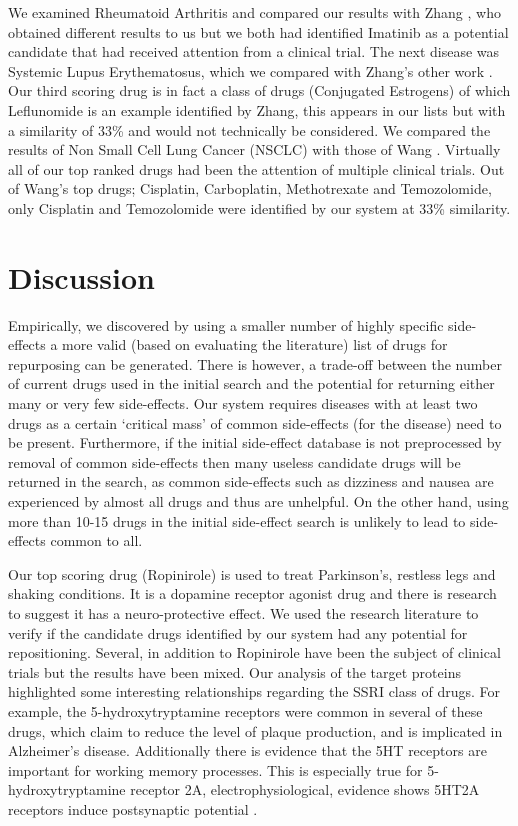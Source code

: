 \documentclass[preprint,11pt]{elsarticle}
\begin{document}
We examined Rheumatoid Arthritis and compared our results with Zhang \cite{Zhang2013}, who obtained different results to us but we both had identified Imatinib as a potential candidate that had received attention from a clinical trial. The next disease was Systemic Lupus Erythematosus, which we compared with Zhang's other work \cite{Zhang2014}. Our third scoring drug is in fact a class of drugs (Conjugated Estrogens) of which Leflunomide is an example identified by Zhang, this appears in our lists but with a similarity of 33\% and would not technically be considered. We compared the results of Non Small Cell Lung Cancer (NSCLC) with those of Wang \cite{Wang2014}. Virtually all of our top ranked drugs had been the attention of multiple clinical trials. Out of Wang's top drugs; Cisplatin, Carboplatin, Methotrexate and Temozolomide, only Cisplatin and Temozolomide were identified by our system at 33\% similarity. 


\section{Discussion}
Empirically, we discovered by using a smaller number of highly specific side-effects a more valid (based on evaluating the literature) list of drugs for repurposing can be generated. There is however, a trade-off between the number of current drugs used in the initial search and the potential for returning either many or very few side-effects. Our system requires diseases with at least two drugs as a certain `critical mass' of common side-effects (for the disease) need to be present. Furthermore, if the initial side-effect database is not preprocessed by removal of common side-effects then many useless candidate drugs will be returned in the search, as common side-effects such as dizziness and nausea are experienced by almost all drugs and thus are unhelpful. On the other hand, using more than 10-15 drugs in the initial side-effect search is unlikely to lead to side-effects common to all.

Our top scoring drug (Ropinirole) is used to treat Parkinson's, restless legs and shaking conditions. It is a dopamine receptor agonist drug and there is research to suggest it has a neuro-protective effect. We used the research literature to  verify if the candidate drugs identified by our system had any potential for repositioning. Several, in addition to Ropinirole have been the subject of clinical trials but the results have been mixed. Our analysis of the target proteins highlighted some interesting relationships regarding the SSRI class of drugs. For example, the 5-hydroxytryptamine receptors were common in several of these drugs, which claim to reduce the level of plaque production, and is implicated in Alzheimer's disease. Additionally there is evidence that the 5HT receptors are important for working memory processes. This is especially true for 5-hydroxytryptamine receptor 2A, electrophysiological, evidence shows 5HT2A receptors induce postsynaptic potential \cite{Ramirez2013}.  
\end{document}
